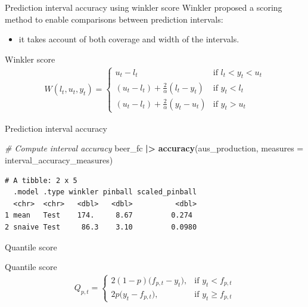 \documentclass[
  14pt,
  ignorenonframetext,
  aspectratio=169,
]{beamer}
\newenvironment{Shaded}{\begin{snugshade}}{\end{snugshade}}
\newcommand{\AttributeTok}[1]{\textcolor[rgb]{0.13,0.29,0.53}{#1}}
\newcommand{\CommentTok}[1]{\textcolor[rgb]{0.56,0.35,0.01}{\textit{#1}}}
\newcommand{\FunctionTok}[1]{\textcolor[rgb]{0.13,0.29,0.53}{\textbf{#1}}}
\newcommand{\NormalTok}[1]{#1}
\newcommand{\SpecialCharTok}[1]{\textcolor[rgb]{0.81,0.36,0.00}{\textbf{#1}}}
\providecommand{\tightlist}{%
  \setlength{\itemsep}{0pt}\setlength{\parskip}{0pt}}
\renewenvironment{Shaded}{\vspace*{0.15cm}\color{black}\fontsize{10}{10}\sf\begin{snugshade}\color{black}}{\end{snugshade}}
\begin{document}
\begin{frame}{Prediction interval accuracy using winkler score}
\protect{}\label{prediction-interval-accuracy-using-winkler-score}
Winkler proposed a scoring method to enable comparisons between
prediction intervals:

\begin{itemize}
\tightlist
\item
  it takes account of both coverage and width of the intervals.
\end{itemize}

\begin{block}{Winkler score}
\begin{align*}
  W(l_t,u_t,y_t) =
    \begin{cases}
      u_t-l_t & \text{if $l_t < y_t <u_t$}\\
      (u_t-l_t)+ \frac{2}{\alpha}(l_t-y_t) & \text{if $y_t < l_t$}\\
      (u_t-l_t) + \frac{2}{\alpha}(y_t-u_t) & \text{if $y_t > u_t$}
    \end{cases}       
\end{align*}
\end{block}
\end{frame}

\begin{frame}[fragile]{Prediction interval accuracy}
\protect{}\label{prediction-interval-accuracy}
\fontsize{11}{12}\sf

\begin{Shaded}
\begin{Highlighting}[]
  \CommentTok{\# Compute interval accuracy}
\NormalTok{beer\_fc }\SpecialCharTok{|\textgreater{}} \FunctionTok{accuracy}\NormalTok{(aus\_production,}
   \AttributeTok{measures =}\NormalTok{ interval\_accuracy\_measures) }
\end{Highlighting}
\end{Shaded}

\begin{verbatim}
# A tibble: 2 x 5
  .model .type winkler pinball scaled_pinball
  <chr>  <chr>   <dbl>   <dbl>          <dbl>
1 mean   Test    174.     8.67         0.274 
2 snaive Test     86.3    3.10         0.0980
\end{verbatim}
\end{frame}

\begin{frame}{Quantile score}
\protect{}\label{quantile-score}
\begin{block}{Quantile score}
\begin{align*}
  Q_{p,t} = 
    \begin{cases}
    2(1 - p) \big(f_{p,t} - y_{t}\big), & \text{if $y_{t} < f_{p,t}$}\\
    2p \big(y_{t} - f_{p,t}\big), & \text{if $y_{t} \ge f_{p,t}$} 
    \end{cases}
\end{align*}
\end{block}
\end{frame}
\end{document}
